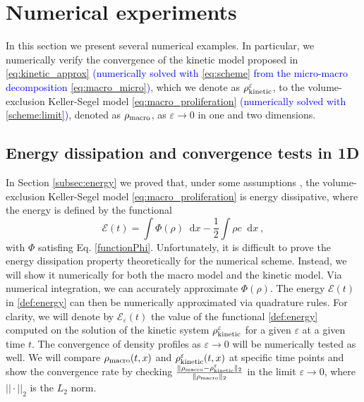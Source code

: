 \documentclass{article}
\newcommand {\e}  {\varepsilon}
\newcommand*\diff{\mathop{}\!\mathrm{d}}
\begin{document}
\section{Numerical experiments}\label{numerical results}

In this section we present several numerical examples.
In particular, we {numerically verify} the convergence of the kinetic model proposed in \eqref{eq:kinetic_approx} \textcolor{blue}{(numerically solved with \eqref{eq:scheme} from the micro-macro decomposition \eqref{eq:macro_micro})}, which we denote as $\rho_\textnormal{kinetic}^\e$, to the volume-exclusion Keller-Segel model \eqref{eq:macro_proliferation} \textcolor{blue}{(numerically solved with \eqref{scheme:limit})}, denoted as $\rho_\textnormal{macro}$, as $\varepsilon\to 0$ in one and two dimensions. 
\subsection{Energy dissipation and convergence tests in 1D}\label{subsec:energy_dissipation}
In Section \ref{subsec:energy} we proved that, under some assumptions \cite{calvez2006volume,carrillo2001entropy,de2018energy}, the volume-exclusion Keller-Segel model \eqref{eq:macro_proliferation} is energy dissipative, 
{where the energy is defined by the functional
\begin{equation}\label{def:energy}
    \mathcal{E}(t)=\int\Phi(\rho)\diff x-\frac{1}{2}\int\rho c\diff x\ ,    
\end{equation}
\noindent with $ \Phi $ satisfing Eq. \eqref{functionPhi}. 
{ Unfortunately, it is difficult to prove the energy dissipation property theoretically for the numerical scheme. 
Instead, we will show it numerically for both the macro model and the kinetic model. 
}
{Via numerical integration, we can accurately approximate $\Phi(\rho)$. The energy $\mathcal{E}(t)$ in \eqref{def:energy} can then be numerically approximated via quadrature rules.} 
For clarity, we will denote by $\mathcal{E}_\e(t)$ the value of the functional \eqref{def:energy} computed on the solution of the kinetic system $\rho_\textnormal{kinetic}^\e$ for a given $\e$ at a given time $t$. } 
The convergence of density profiles as $\varepsilon\to0$ will be numerically tested as well. 
We will compare $\rho_\textnormal{macro}(t,x)$ and $\rho_\textnormal{kinetic}^{\varepsilon}(t,x)$ at specific time points and show the convergence rate by checking $\frac{\|\rho_\textnormal{macro}-\rho_\textnormal{kinetic}^{\varepsilon}\|_2}{\| \rho_\textnormal{macro}\|_2}$ in the limit $\varepsilon\to0$, where $||\cdot||_2$ is the $L_2$ norm.
\end{document}
